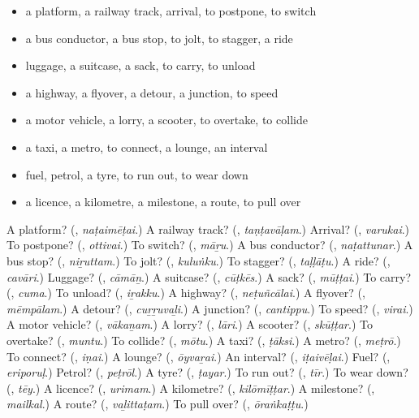 \begin{itemize}
\raggedright
  \item a platform, a railway track, arrival, to postpone, to switch
  \item a bus conductor, a bus stop, to jolt, to stagger, a ride
  \item luggage, a suitcase, a sack, to carry, to unload
  \item a highway, a flyover, a detour, a junction, to speed
  \item a motor vehicle, a lorry, a scooter, to overtake, to collide
  \item a taxi, a metro, to connect, a lounge, an interval
  \item fuel, petrol, a tyre, to run out, to wear down
  \item a licence, a kilometre, a milestone, a route, to pull over
\end{itemize}

\begin{tcolorbox}[breakable,colback=teal!4,colframe=teal!35!black,title={Before you move on}]
A platform? (\textbf{}, \emph{naṭaimēṭai}.) A railway track? (\textbf{}, \emph{taṇṭavāḷam}.) Arrival? (\textbf{}, \emph{varukai}.) To postpone? (\textbf{}, \emph{ottivai}.) To switch? (\textbf{}, \emph{māṟu}.) A bus conductor? (\textbf{}, \emph{naṭattunar}.) A bus stop? (\textbf{}, \emph{niṟuttam}.) To jolt? (\textbf{}, \emph{kuluṅku}.) To stagger? (\textbf{}, \emph{taḷḷāṭu}.) A ride? (\textbf{}, \emph{cavāri}.) Luggage? (\textbf{}, \emph{cāmāṉ}.) A suitcase? (\textbf{}, \emph{cūṭkēs}.) A sack? (\textbf{}, \emph{mūṭṭai}.) To carry? (\textbf{}, \emph{cuma}.) To unload? (\textbf{}, \emph{iṟakku}.) A highway? (\textbf{}, \emph{neṭuñcālai}.) A flyover? (\textbf{}, \emph{mēmpālam}.) A detour? (\textbf{}, \emph{cuṟṟuvaḻi}.) A junction? (\textbf{}, \emph{cantippu}.) To speed? (\textbf{}, \emph{virai}.) A motor vehicle? (\textbf{}, \emph{vākaṉam}.) A lorry? (\textbf{}, \emph{lāri}.) A scooter? (\textbf{}, \emph{skūṭṭar}.) To overtake? (\textbf{}, \emph{muntu}.) To collide? (\textbf{}, \emph{mōtu}.) A taxi? (\textbf{}, \emph{ṭāksi}.) A metro? (\textbf{}, \emph{meṭrō}.) To connect? (\textbf{}, \emph{iṇai}.) A lounge? (\textbf{}, \emph{ōyvaṟai}.) An interval? (\textbf{}, \emph{iṭaivēḷai}.) Fuel? (\textbf{}, \emph{eriporuḷ}.) Petrol? (\textbf{}, \emph{peṭrōl}.) A tyre? (\textbf{}, \emph{ṭayar}.) To run out? (\textbf{}, \emph{tīr}.) To wear down? (\textbf{}, \emph{tēy}.) A licence? (\textbf{}, \emph{urimam}.) A kilometre? (\textbf{}, \emph{kilōmīṭṭar}.) A milestone? (\textbf{}, \emph{mailkal}.) A route? (\textbf{}, \emph{vaḻittaṭam}.) To pull over? (\textbf{}, \emph{ōraṅkaṭṭu}.)
\end{tcolorbox}
